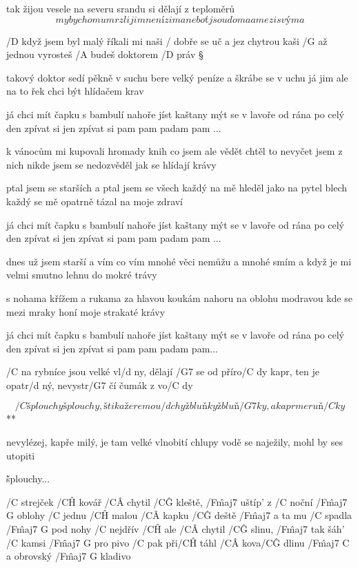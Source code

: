 tak žijou vesele na severu
srandu si dělají z teploměrů
\[ my bychom umrzli jim není zima
neboť jsou doma a mezi svýma \]




/D když jsem byl malý říkali mi naši
/ dobře se uč a jez chytrou kaši
/G až jednou vyrosteš /A budeš doktorem /D práv \S

takový doktor sedí pěkně v suchu
bere velký peníze a škrábe se v uchu
já jim ale na to řek chci být hlídačem krav \s

já chci mít čapku s bambulí nahoře
jíst kaštany mýt se v lavoře
od rána po celý den
zpívat si jen
zpívat si pam pam padam pam ... \s

k vánocům mi kupovali hromady knih
co jsem ale vědět chtěl to nevyčet jsem z nich
nikde jsem se nedozvěděl jak se hlídají krávy \s

ptal jsem se starších a ptal jsem se všech
každý na mě hleděl jako na pytel blech
každý se mě opatrně tázal na moje zdraví \s

já chci mít čapku s bambulí nahoře
jíst kaštany mýt se v lavoře
od rána po celý den
zpívat si jen
zpívat si pam pam padam pam ... \s

dnes už jsem starší a vím co vím
mnohé věci nemůžu a mnohé smím
a když je mi velmi smutno lehnu do mokré trávy \s

s nohama křížem a rukama za hlavou
koukám nahoru na oblohu modravou
kde se mezi mraky honí moje strakaté krávy \s

já chci mít čapku s bambulí nahoře
jíst kaštany mýt se v lavoře
od rána po celý den
zpívat si jen
zpívat si pam pam padam pam...




/C na rybníce jsou velké vl/d ny, dělají /G7 se od příro/C dy
kapr, ten je opatr/d ný, nevystr/G7 čí čumák z vo/C dy

\R  \[ /C šplouchy šplouchy, štika žere mou/d chy
    žbluňky žbluň/G7 ky, a kapr meruň/C ky \] **

nevylézej, kapře milý, je tam velké vlnobití
chlupy vodě se naježily, mohl by ses utopiti

\r šplouchy...




/C strejček /C\^H kovář /C\^A chytil /C\^G kleště, /F\^{maj7} uštíp' z /C noční /{F\^{maj7} G} oblohy
/C jednu /C\^H malou /C\^A kapku /C\^G deště /F\^{maj7} a ta mu /C spadla /{F\^{maj7} G} pod nohy
/C nejdřív /C\^H ale /C\^A chytil /C\^G slinu, /F\^{maj7} tak šáh' /C kamsi /{F\^{maj7} G} pro pivo
/C pak při/C\^H táhl /C\^A kova/C\^G dlinu /{F\^{maj7} C} a obrovský /{F\^{maj7} G} kladivo

